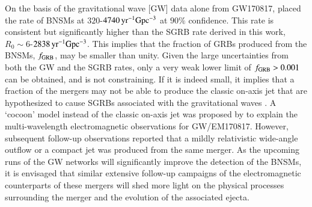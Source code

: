 On the basis of the gravitational wave [GW] data alone from GW170817, \cite{GW170817-2017} placed the rate of BNSMs at $320$-$4740 \, {\rm yr^{-1}Gpc^{-3}} $ at $90\%$ confidence. This rate is consistent but significantly higher than the SGRB rate derived in this work, $R_0 \sim 6 $-$ 2838 \, {\rm yr^{-1}Gpc^{-3}} $. This implies that the fraction of GRBs produced from the BNSMs, $f_{{\rm GRB}}$, may be smaller than unity.  Given the large uncertainties from both the GW and the SGRB rates, only a very weak lower limit of $f_{{\rm GRB}} > 0.001$ can be obtained, and is not constraining. If it is indeed small, it implies that a fraction of the mergers may not be able to produce the classic on-axis jet that are hypothesized to cause SGRBs associated with the gravitational waves \citep{Narayan_et_al.-1992-ApJ}. A `cocoon' model instead of the classic on-axis jet was proposed by \cite{Kasliwal_et_al.-2017-Science} to explain the multi-wavelength electromagnetic observations for GW/EM170817. However, subsequent follow-up observations reported that a mildly relativistic wide-angle outflow \citep{Mooley_et_al.-2018-Nature} or a compact jet \citep{Ghirlanda_et_Al.-2019-Science} was produced from the same merger. As the upcoming runs of the GW networks will significantly improve the detection of the BNSMs, it is envisaged that similar extensive follow-up campaigns of the electromagnetic counterparts of these mergers will shed more light on the physical processes surrounding the merger and the evolution of the associated ejecta.


